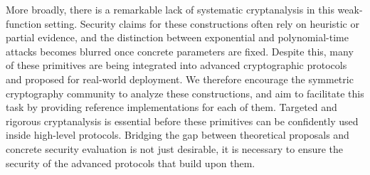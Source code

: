 \documentclass[journal=tosc,submission]{iacrtrans}
\theoremstyle{theorem}
\newcommand\yr[1]{\textcolor{brown!80}{\textbf{Yann:} #1}}
\begin{document}
More broadly, there is a remarkable lack of systematic cryptanalysis in this weak-function setting. Security claims for these constructions often rely on heuristic or partial evidence, and the distinction between exponential and polynomial-time attacks becomes blurred once concrete parameters are fixed. Despite this, many of these primitives are being integrated into advanced cryptographic protocols and proposed for real-world deployment. We therefore encourage the symmetric cryptography community to analyze these constructions, and aim to facilitate this task by providing reference implementations for each of them. Targeted and rigorous cryptanalysis is essential before these primitives can be confidently used inside high-level protocols. Bridging the gap between theoretical proposals and concrete security evaluation is not just desirable,  it is necessary to ensure the security of the advanced protocols that build upon them.





\end{document}

